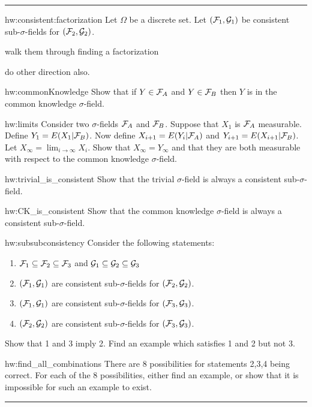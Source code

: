 \documentclass[14pt]{extarticle}
\newenvironment{textHW}{
  \noindent\rule{\textwidth}{1pt}%
  \begin{list}{}{
      \setlength{\labelwidth}{1cm}
      \setlength{\labelsep}{0.3cm}
      \setlength{\leftmargin}{1.3cm}
      \setlength{\rightmargin}{1cm}
      \setlength{\parsep}{0.5ex plus0.2ex minus0.1ex}
      \setlength{\topsep}{1pt plus3pt minus1pt}
      \setlength{\itemsep}{0ex plus0.2ex} 
      \renewcommand{\makelabel}[1]{\label{thw:##1}{\ref{##1}}}
      \sl}}%
  {\end{list}\rule{\textwidth}{1pt}}
\newcommand{\notes}{}
\begin{document}
\begin{textHW}
\item[hw:consistent:factorization] Let $\Omega$ be a discrete set.  Let
  $({\cal F}_1, {\cal G}_1)$ be consistent sub-$\sigma$-fields for
  $({\cal F}_2, {\cal G}_2)$.  

  {\sloppy \notes walk them through finding a factorization}

  {\sloppy \notes do other direction also.}

\item[hw:commonKnowledge] Show that if $Y \in {\cal F}_A$ and $Y \in
  {\cal F}_B$ then $Y$ is in the common knowledge $\sigma$-field.
\item[hw:limits] Consider two $\sigma$-fields ${\cal F}_A$ and ${\cal
    F}_B$.  Suppose that $X_1$ is ${\cal F}_A$ measurable.  Define
  $Y_1 = E(X_1|{\cal F}_B)$.  Now define $X_{i+1} = E(Y_i|{\cal F}_A)$
  and $Y_{i+1} = E(X_{i+1}|{\cal F}_B)$.  Let $X_\infty = \lim_{i \to
    \infty} X_i$.  Show that $X_\infty = Y_\infty$ and that they are
  both measurable with respect to the common knowledge
  $\sigma$-field.
\item[hw:trivial_is_consistent] Show that the trivial $\sigma$-field is
  always a consistent sub-$\sigma$-field.
\item[hw:CK_is_consistent] Show that the common knowledge $\sigma$-field
  is always a consistent sub-$\sigma$-field. 
\item[hw:subsubconsistency]  Consider the following statements:
  \begin{enumerate}
  \item ${\cal F}_1 \subseteq {\cal F}_2 \subseteq
    {\cal F}_3$ and ${\cal G}_1 \subseteq {\cal G}_2 \subseteq
    {\cal G}_3$ 
  \item $({\cal F}_1,{\cal G}_1)$ are consistent sub-$\sigma$-fields
    for $({\cal F}_2,{\cal G}_2)$. 
  \item $({\cal F}_1,{\cal G}_1)$ are consistent sub-$\sigma$-fields
    for $({\cal F}_3,{\cal G}_3)$. 
  \item $({\cal F}_2,{\cal G}_2)$ are consistent sub-$\sigma$-fields
    for $({\cal F}_3,{\cal G}_3)$. 
  \end{enumerate}
  Show that 1 and 3 imply 2.  Find an example which satisfies 1 and 2
  but not 3.
\item[hw:find_all_combinations]  There are 8 possibilities for statements
  2,3,4 being correct.  For each of the 8 possibilities, either find
  an example, or show that it is impossible for such an example to
  exist. 
\end{textHW}
\end{document}
